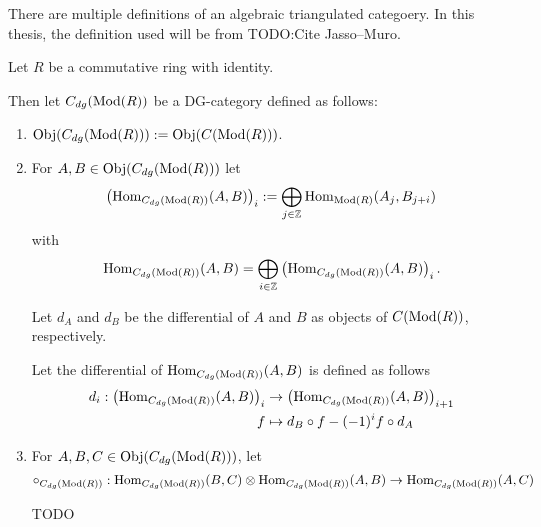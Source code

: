 There are multiple definitions of an algebraic triangulated categoery. In this thesis, the definition used will be from TODO:Cite Jasso--Muro.

\begin{definition}
    Let \( R \) be a commutative ring with identity.

    Then let \( C_{dg}(\operatorname{Mod}(R)) \) be a DG-category defined as follows:
    \begin{enumerate}
        \item {
            \( \operatorname{Obj}(C_{dg}(\operatorname{Mod}(R))) := \operatorname{Obj}(C(\operatorname{Mod}(R))) \).
        }
        \item {
            For \( A, B \in \operatorname{Obj}(C_{dg}(\operatorname{Mod}(R))) \) let
            \[ 
                \left( \operatorname{Hom}_{C_{dg}(\operatorname{Mod}(R))}(A, B) \right)_i := \bigoplus_{j \in {\mathbb{Z}}} \operatorname{Hom}_{\operatorname{Mod}(R)}(A_j, B_{j + i})
            \]
            with
            \[
                \operatorname{Hom}_{C_{dg}(\operatorname{Mod}(R))}(A, B) = \bigoplus_{i \in {\mathbb{Z}}} \left( \operatorname{Hom}_{C_{dg}(\operatorname{Mod}(R))}(A, B) \right)_i.
            \]

            Let \( d_A \) and \( d_B \) be the differential of \( A \) and \( B \) as objects of \( C(\operatorname{Mod}(R)) \), respectively.

            Let the differential of \( \operatorname{Hom}_{C_{dg}(\operatorname{Mod}(R))}(A, B) \) is defined as follows
            \begin{align*}
                d_i: \left( \operatorname{Hom}_{C_{dg}(\operatorname{Mod}(R))}(A, B) \right)_i &\to \left( \operatorname{Hom}_{C_{dg}(\operatorname{Mod}(R))}(A, B) \right)_{i + 1} \\
                f &\mapsto d_B \circ f - (-1)^i f \circ d_A
            \end{align*}
        }
        \item {
            For \( A, B, C \in \operatorname{Obj}(C_{dg}(\operatorname{Mod}(R))) \), let
            \[
                \circ_{C_{dg}(\operatorname{Mod}(R))}: \operatorname{Hom}_{C_{dg}(\operatorname{Mod}(R))}(B, C) \otimes \operatorname{Hom}_{C_{dg}(\operatorname{Mod}(R))}(A, B) \to \operatorname{Hom}_{C_{dg}(\operatorname{Mod}(R))}(A, C)
            \]

            TODO
        }
    \end{enumerate}
\end{definition}
